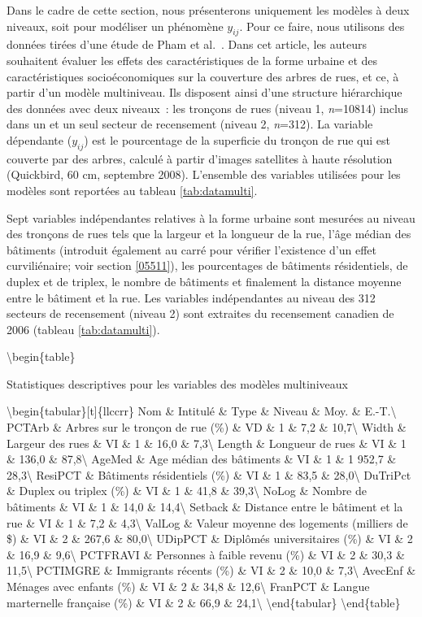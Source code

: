 \documentclass[
  11pt,
  french,
]{book}
\begin{document}
Dans le cadre de cette section, nous présenterons uniquement les modèles à deux niveaux, soit pour modéliser un phénomène \(y_{ij}\). Pour ce faire, nous utilisons des données tirées d'une étude de Pham et al.~\citeyearpar{apparicio2017disentangling}. Dans cet article, les auteurs souhaitent évaluer les effets des caractéristiques de la forme urbaine et des caractéristiques socioéconomiques sur la couverture des arbres de rues, et ce, à partir d'un modèle multiniveau. Ils disposent ainsi d'une structure hiérarchique des données avec deux niveaux~: les tronçons de rues (niveau 1, \emph{n}=10814) inclus dans un et un seul secteur de recensement (niveau 2, \emph{n}=312). La variable dépendante (\(y_{ij}\)) est le pourcentage de la superficie du tronçon de rue qui est couverte par des arbres, calculé à partir d'images satellites à haute résolution (Quickbird, 60 cm, septembre 2008). L'ensemble des variables utilisées pour les modèles sont reportées au tableau \ref{tab:datamulti}.

Sept variables indépendantes relatives à la forme urbaine sont mesurées au niveau des tronçons de rues tels que la largeur et la longueur de la rue, l'âge médian des bâtiments (introduit également au carré pour vérifier l'existence d'un effet curviliénaire; voir section \ref{05511}), les pourcentages de bâtiments résidentiels, de duplex et de triplex, le nombre de bâtiments et finalement la distance moyenne entre le bâtiment et la rue. Les variables indépendantes au niveau des 312 secteurs de recensement (niveau 2) sont extraites du recensement canadien de 2006 (tableau \ref{tab:datamulti}).

\textbackslash begin\{table\}

\caption{\label{tab:datamulti}Statistiques descriptives pour les variables des modèles multiniveaux}
\centering
\fontsize{8}{10}\selectfont

\textbackslash begin\{tabular\}{[}t{]}\{llccrr\}
\toprule
Nom \& Intitulé \& Type \& Niveau \& Moy. \& E.-T.\textbackslash{}
\midrule
PCTArb \& Arbres sur le tronçon de rue (\%) \& VD \& 1 \& 7,2 \& 10,7\textbackslash{}
Width \& Largeur des rues \& VI \& 1 \& 16,0 \& 7,3\textbackslash{}
Length \& Longueur de rues \& VI \& 1 \& 136,0 \& 87,8\textbackslash{}
AgeMed \& Age médian des bâtiments \& VI \& 1 \& 1 952,7 \& 28,3\textbackslash{}
ResiPCT \& Bâtiments résidentiels (\%) \& VI \& 1 \& 83,5 \& 28,0\textbackslash{}
\addlinespace
DuTriPct \& Duplex ou triplex (\%) \& VI \& 1 \& 41,8 \& 39,3\textbackslash{}
NoLog \& Nombre de bâtiments \& VI \& 1 \& 14,0 \& 14,4\textbackslash{}
Setback \& Distance entre le bâtiment et la rue \& VI \& 1 \& 7,2 \& 4,3\textbackslash{}
ValLog \& Valeur moyenne des logements (milliers de \$) \& VI \& 2 \& 267,6 \& 80,0\textbackslash{}
UDipPCT \& Diplômés universitaires (\%) \& VI \& 2 \& 16,9 \& 9,6\textbackslash{}
\addlinespace
PCTFRAVI \& Personnes à faible revenu (\%) \& VI \& 2 \& 30,3 \& 11,5\textbackslash{}
PCTIMGRE \& Immigrants récents (\%) \& VI \& 2 \& 10,0 \& 7,3\textbackslash{}
AvecEnf \& Ménages avec enfants (\%) \& VI \& 2 \& 34,8 \& 12,6\textbackslash{}
FranPCT \& Langue marternelle française (\%) \& VI \& 2 \& 66,9 \& 24,1\textbackslash{}
\bottomrule
\textbackslash end\{tabular\}
\textbackslash end\{table\}
\end{document}
